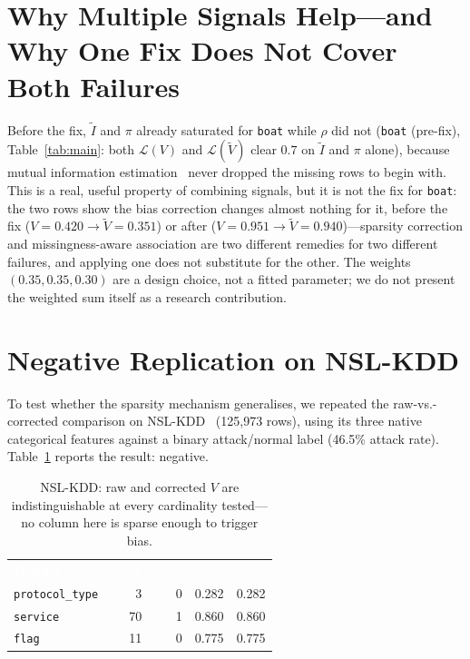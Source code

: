 \documentclass[sigconf,anonymous=false]{acmart}
\begin{document}
\section{Why Multiple Signals Help---and Why One Fix Does Not Cover Both Failures}
\label{sec:multisignal}

Before the fix, $\widetilde{I}$ and $\pi$ already saturated for
\texttt{boat} while $\rho$ did not (\texttt{boat} (pre-fix), Table~\ref{tab:main}:
both $\mathcal{L}(V)$ and $\mathcal{L}(\widetilde{V})$ clear $0.7$ on
$\widetilde{I}$ and $\pi$ alone), because mutual information
estimation~\cite{kraskov2004estimating} never dropped the missing rows to
begin with. This is a real, useful property of combining signals, but it
is not the fix for \texttt{boat}: the two rows show the bias correction
changes almost nothing for it, before the fix
($V{=}0.420\to\widetilde{V}{=}0.351$) or after
($V{=}0.951\to\widetilde{V}{=}0.940$)---sparsity correction and
missingness-aware association are two different remedies for two different
failures, and applying one does not substitute for the other. The weights
$(0.35, 0.35, 0.30)$ are a design choice, not a fitted parameter; we do not
present the weighted sum itself as a research contribution.

\section{Negative Replication on NSL-KDD}
\label{sec:nslkdd}

To test whether the sparsity mechanism generalises, we repeated the raw-vs.-corrected
comparison on NSL-KDD~\cite{tavallaee2009nslkdd} (125{,}973 rows), using its
three native categorical features against a binary attack/normal label
(46.5\% attack rate). Table~\ref{tab:nslkdd} reports the result: negative.

\begin{table}[h]
\centering
\caption{NSL-KDD: raw and corrected $V$ are indistinguishable at every
  cardinality tested---no column here is sparse enough to trigger bias.}
\label{tab:nslkdd}
\small
\begin{tabular}{lrrrr}
\toprule
\rowcolor{diagAccent}
\textcolor{white}{\textbf{Feature}} & \textcolor{white}{Card.} & \textcolor{white}{Sing.} & \textcolor{white}{$V$} & \textcolor{white}{$\widetilde{V}$} \\
\texttt{protocol\_type} & 3  & 0 & 0.282 & 0.282 \\
\texttt{service}        & 70 & 1 & 0.860 & 0.860 \\
\texttt{flag}           & 11 & 0 & 0.775 & 0.775 \\
\bottomrule
\end{tabular}
\end{table}
\end{document}
